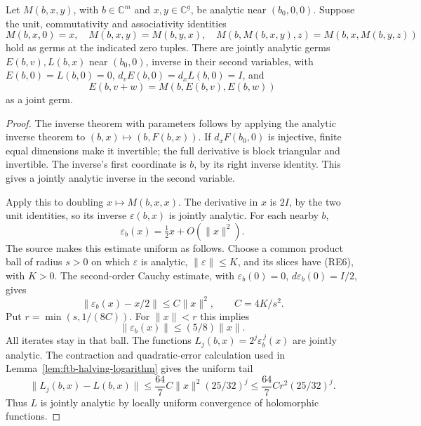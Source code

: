 \begin{srlemma}
\label{lem:ftb-parametric-halving-logarithm}
Let \(M(b,x,y)\), with \(b\in\mathbb C^m\) and
\(x,y\in\mathbb C^g\), be analytic near \((b_0,0,0)\).
Suppose the unit, commutativity and associativity identities
\[
 M(b,x,0)=x,\quad M(b,x,y)=M(b,y,x),\quad
 M(b,M(b,x,y),z)=M(b,x,M(b,y,z))
                                                               \tag{RE4}
\]
hold as germs at the indicated zero tuples.
There are jointly analytic germs \(E(b,v),L(b,x)\) near
\((b_0,0)\), inverse in their second variables, with
\(E(b,0)=L(b,0)=0\), \(d_vE(b,0)=d_xL(b,0)=I\),
and
\[
       E(b,v+w)=M(b,E(b,v),E(b,w))                            \tag{RE5}
\]
as a joint germ.
\end{srlemma}
\begin{proof}
The inverse theorem with parameters follows by applying
the analytic inverse theorem to \((b,x)\mapsto(b,F(b,x))\).
If \(d_xF(b_0,0)\) is injective, finite equal dimensions
make it invertible; the full derivative is block triangular
and invertible.
The inverse's first coordinate is \(b\), by its right
inverse identity.
This gives a jointly analytic inverse in the second variable.

Apply this to doubling \(x\mapsto M(b,x,x)\).
The derivative in \(x\) is \(2I\), by the two unit identities,
so its inverse \(\varepsilon(b,x)\) is jointly analytic.
For each nearby \(b\),
\[
                 \varepsilon_b(x)=\tfrac12x+O(\|x\|^2).
                                                               \tag{RE6}
\]
The source makes this estimate uniform as follows.
Choose a common product ball of radius \(s>0\) on which
\(\varepsilon\) is analytic, \(\|\varepsilon\|\le K\),
and its slices have (RE6), with \(K>0\).
The second-order Cauchy estimate, with
\(\varepsilon_b(0)=0\), \(d\varepsilon_b(0)=I/2\),
gives
\[
 \|\varepsilon_b(x)-x/2\|\le C\|x\|^2,\qquad C=4K/s^2.
\]
Put \(r=\min(s,1/(8C))\).
For \(\|x\|<r\) this implies
\[
                       \|\varepsilon_b(x)\|\le(5/8)\|x\|.
                                                               \tag{RE7}
\]
All iterates stay in that ball.
The functions
\(L_j(b,x)=2^j\varepsilon_b^{\,j}(x)\) are jointly analytic.
The contraction and quadratic-error calculation used in
Lemma~\ref{lem:ftb-halving-logarithm} gives the uniform tail
\[
 \|L_j(b,x)-L(b,x)\|
    \le \frac{64}{7}C\|x\|^2(25/32)^j
    \le \frac{64}{7}Cr^2(25/32)^j.                          \tag{RE8}
\]
Thus \(L\) is jointly analytic by locally uniform
convergence of holomorphic functions.


\end{proof}
